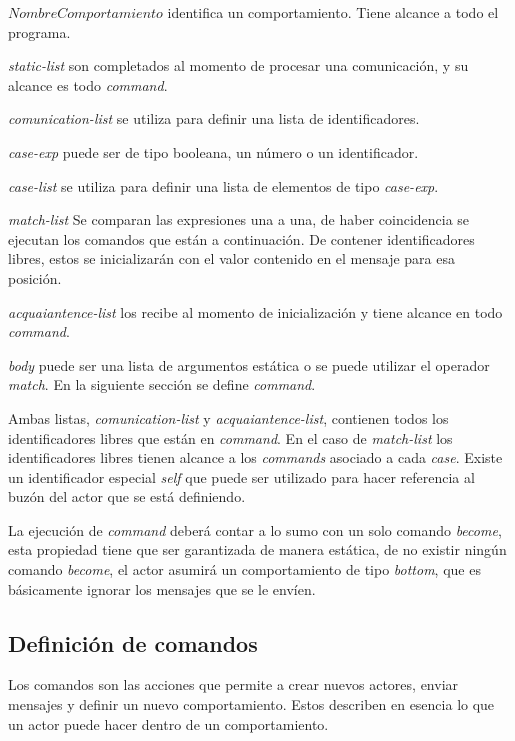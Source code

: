 \begin{description}
 \item $NombreComportamiento$ identifica un comportamiento. Tiene alcance a todo el programa. 
 \item \textit{static-list} son completados al momento de procesar una comunicación, y su alcance es todo \textit{command}. 
 \item \textit{comunication-list} se utiliza para definir una lista de identificadores.
 \item \textit{case-exp} puede ser de tipo booleana, un número o un identificador. 
 \item \textit{case-list} se utiliza para definir una lista de elementos de tipo \textit{case-exp}.
 \item \textit{match-list} Se comparan las expresiones una a una, de haber coincidencia se ejecutan los comandos que están a continuación. De contener identificadores libres, estos se inicializarán con el valor contenido en el mensaje para esa posición.
 \item \textit{acquaiantence-list} los recibe al momento de inicialización y tiene alcance en todo \textit{command}.
 \item \textit{body} puede ser una lista de argumentos estática o se puede utilizar el operador \textit{match}. En la siguiente sección se define \textit{command}.
\end{description}

Ambas listas, \textit{comunication-list} y \textit{acquaiantence-list}, contienen todos los identificadores libres que están en \textit{command}. En el caso de \textit{match-list} los identificadores libres tienen alcance a los \textit{commands} asociado a cada \textit{case}. Existe un identificador especial \textit{self} que puede ser utilizado para hacer referencia al buzón del actor que se está definiendo. 

La ejecución de \textit{command} deberá contar a lo sumo con un solo comando \textit{become}, esta propiedad tiene que ser garantizada de manera estática, de no existir ningún comando \textit{become}, el actor asumirá un comportamiento de tipo \textit{bottom}, que es básicamente ignorar los mensajes que se le envíen.

\subsection{Definición de comandos}\label{actores:cmd}
Los comandos son las acciones que permite a \SAL crear nuevos actores, enviar mensajes y definir un nuevo comportamiento. Estos describen en esencia lo que un actor puede hacer dentro de un comportamiento.

